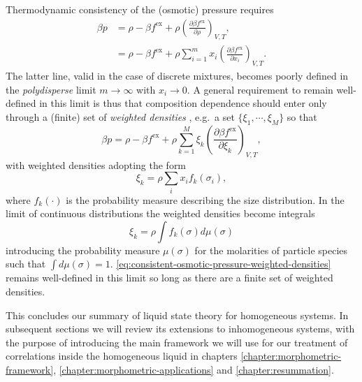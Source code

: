 Thermodynamic consistency of the (osmotic) pressure requires
\begin{subequations}
  \begin{align}
    \label{eq:consistent-osmotic-pressure}
    \beta p
    &=
    \rho - \beta f^\mathrm{ex}
    + \rho \left( \frac{\partial \beta f^\mathrm{ex}}{\partial \rho} \right)_{V,T},
    \\
    \label{eq:consistent-osmotic-pressure-mixtures}
    &=
    \rho - \beta f^\mathrm{ex}
    + \rho \sum_{i=1}^m
    x_i \left( \frac{\partial \beta f^\mathrm{ex}}{\partial x_i} \right)_{V,T}.
  \end{align}
\end{subequations}
The latter line, valid in the case of discrete mixtures, becomes poorly defined in the \emph{polydisperse} limit $m \to \infty$ with $x_i \to 0$.
A general requirement to remain well-defined in this limit is thus that composition dependence should enter only through a (finite) set of \emph{weighted densities} \cite{GualtieriJCP1982, WarrenPRL1998, SollichPRL1998, SollichAiCP2001}, e.g.\ a set $\{\xi_1, \cdots, \xi_M\}$ so that
\begin{equation}\label{eq:consistent-osmotic-pressure-weighted-densities}
  \beta p
  =
  \rho - \beta f^\mathrm{ex}
  + \rho \sum_{k=1}^M
  \xi_k \left( \frac{\partial \beta f^\mathrm{ex}}{\partial \xi_k} \right)_{V,T},
\end{equation}
with weighted densities adopting the form
\begin{equation*}
  \xi_k
  =
  \rho \sum_i x_i f_k(\sigma_i),
\end{equation*}
where $f_k(\cdot)$ is the probability measure describing the size distribution.
In the limit of continuous distributions the weighted densities become integrals
\begin{equation}\label{eq:continuous-xi}
  \xi_k
  =
  \rho \int f_k(\sigma) d\mu(\sigma)
\end{equation}
introducing the probability measure $\mu(\sigma)$ for the molarities of particle species such that $\int d\mu(\sigma) = 1$.
\eqref{eq:consistent-osmotic-pressure-weighted-densities} remains well-defined in this limit so long as there are a finite set of weighted densities.

This concludes our summary of liquid state theory for homogeneous systems.
In subsequent sections we will review its extensions to inhomogeneous systems, with the purpose of introducing the main framework we will use for our treatment of correlations inside the homogeneous liquid in chapters \ref{chapter:morphometric-framework}, \ref{chapter:morphometric-applications} and \ref{chapter:resummation}.
